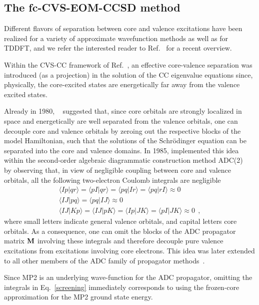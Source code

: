 \documentclass[journal=jctcce,manuscript=article]{achemso}
\begin{document}
\subsection{The fc-CVS-EOM-CCSD method}
Different flavors of separation between core and valence excitations have been realized for a variety of approximate wavefunction methods as well as for TDDFT, and we refer the interested reader to Ref.~ 
for a recent overview. 

Within the CVS-CC framework of Ref.~, an effective core-valence separation was introduced (as a projection) in the solution of the CC eigenvalue equations since, physically, the core-excited states are energetically far away from the valence excited states.

Already in 1980, \citeauthor{Cederbaum1980}~\cite{Cederbaum1980} suggested that,
since core orbitals are strongly localized in space and energetically are well separated from the valence orbitals, 
one can decouple core and valence orbitals by zeroing out the respective blocks of the model Hamiltonian, such that the
solutions of the Schr\"odinger equation can be separated into the core and valence domains.
In 1985, \citeauthor{Barth1985}\cite{Barth1985}  
implemented this idea within the second-order 
algebraic diagrammatic construction method ADC(2)~\cite{ADC82,Dreuw:ADCrev:2014}
by observing that, in view of negligible coupling between core and valence orbitals, all the following two-electron Coulomb integrals are negligible
%
\begin{align}
\label{screening}
\langle Ip|qr \rangle = \langle pI|qr \rangle = \langle pq|Ir \rangle =
\langle pq|rI \rangle \approx 0 \\\nonumber 
\langle IJ | pq \rangle = \langle pq |IJ \rangle \approx 0 \\\nonumber
\langle IJ | Kp \rangle = \langle IJ | pK \rangle = 
\langle Ip | JK \rangle = \langle pI | JK \rangle \approx 0~~,
\end{align}
where small letters indicate general valence orbitals, and capital letters  core orbitals. As a consequence, one can omit the blocks of the ADC propagator matrix ${\bf M}$ involving these integrals and therefore decouple pure valence excitations from excitations involving core electrons. 
This idea was later extended to all other members of the ADC family of propagator methods~\cite{Angonoa_CVS,ADC_ISR_Kshell,Dreuw:ADCrev:2014,wenzel2014}. 

Since MP2 is an underlying wave-function for the ADC propagator\cite{Dreuw:ADCrev:2014}, omitting the integrals in Eq.~\eqref{screening} immediately corresponds to using the frozen-core approximation for the MP2 ground state energy.
\end{document}
